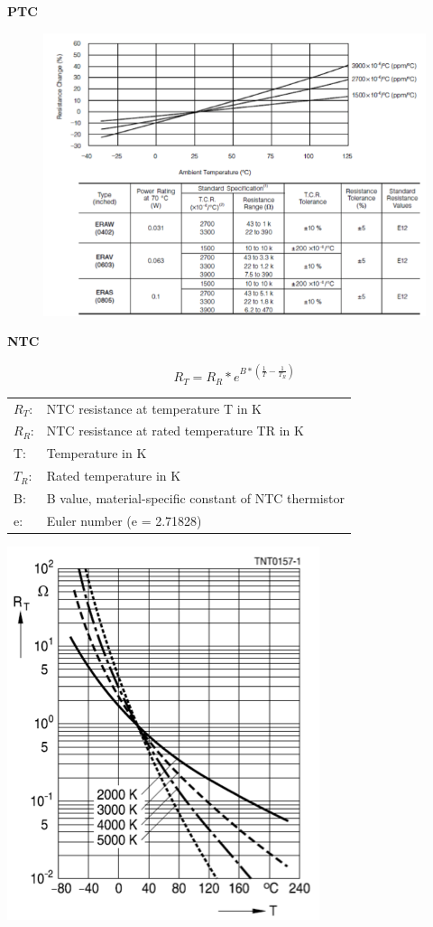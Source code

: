 \textbf{PTC}\\
\begin{figure}[htbs]
\includegraphics[scale=0.5]{pictures/ptc}
\end{figure}

\textbf{NTC}\\
\begin{minipage}{9cm}
\begin{equation}
R_{T}=R_{R}*e^{B*(\frac{1}{T}-\frac{1}{T_{R}})}
\end{equation}
\begin{tabular}{ll}
  $R_{T}$: &NTC resistance at temperature T in K\\
  $R_{R}$: &NTC resistance at rated temperature TR in K\\
  T: &Temperature in K\\
  $T_{R}$: &Rated temperature in K\\
  B: &B value, material-specific constant of NTC thermistor\\
  e: &Euler number (e = 2.71828)
\end{tabular}
\end{minipage}
\begin{minipage}{9cm}
\includegraphics[scale=0.5]{pictures/ntc}
\end{minipage}

